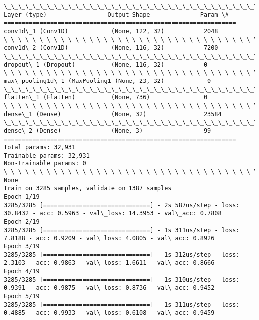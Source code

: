 \documentclass[11pt]{article}
\begin{document}
    \begin{Verbatim}[commandchars=\\\{\}]
\_\_\_\_\_\_\_\_\_\_\_\_\_\_\_\_\_\_\_\_\_\_\_\_\_\_\_\_\_\_\_\_\_\_\_\_\_\_\_\_\_\_\_\_\_\_\_\_\_\_\_\_\_\_\_\_\_\_\_\_\_\_\_\_\_
Layer (type)                 Output Shape              Param \#   
=================================================================
conv1d\_1 (Conv1D)            (None, 122, 32)           2048      
\_\_\_\_\_\_\_\_\_\_\_\_\_\_\_\_\_\_\_\_\_\_\_\_\_\_\_\_\_\_\_\_\_\_\_\_\_\_\_\_\_\_\_\_\_\_\_\_\_\_\_\_\_\_\_\_\_\_\_\_\_\_\_\_\_
conv1d\_2 (Conv1D)            (None, 116, 32)           7200      
\_\_\_\_\_\_\_\_\_\_\_\_\_\_\_\_\_\_\_\_\_\_\_\_\_\_\_\_\_\_\_\_\_\_\_\_\_\_\_\_\_\_\_\_\_\_\_\_\_\_\_\_\_\_\_\_\_\_\_\_\_\_\_\_\_
dropout\_1 (Dropout)          (None, 116, 32)           0         
\_\_\_\_\_\_\_\_\_\_\_\_\_\_\_\_\_\_\_\_\_\_\_\_\_\_\_\_\_\_\_\_\_\_\_\_\_\_\_\_\_\_\_\_\_\_\_\_\_\_\_\_\_\_\_\_\_\_\_\_\_\_\_\_\_
max\_pooling1d\_1 (MaxPooling1 (None, 23, 32)            0         
\_\_\_\_\_\_\_\_\_\_\_\_\_\_\_\_\_\_\_\_\_\_\_\_\_\_\_\_\_\_\_\_\_\_\_\_\_\_\_\_\_\_\_\_\_\_\_\_\_\_\_\_\_\_\_\_\_\_\_\_\_\_\_\_\_
flatten\_1 (Flatten)          (None, 736)               0         
\_\_\_\_\_\_\_\_\_\_\_\_\_\_\_\_\_\_\_\_\_\_\_\_\_\_\_\_\_\_\_\_\_\_\_\_\_\_\_\_\_\_\_\_\_\_\_\_\_\_\_\_\_\_\_\_\_\_\_\_\_\_\_\_\_
dense\_1 (Dense)              (None, 32)                23584     
\_\_\_\_\_\_\_\_\_\_\_\_\_\_\_\_\_\_\_\_\_\_\_\_\_\_\_\_\_\_\_\_\_\_\_\_\_\_\_\_\_\_\_\_\_\_\_\_\_\_\_\_\_\_\_\_\_\_\_\_\_\_\_\_\_
dense\_2 (Dense)              (None, 3)                 99        
=================================================================
Total params: 32,931
Trainable params: 32,931
Non-trainable params: 0
\_\_\_\_\_\_\_\_\_\_\_\_\_\_\_\_\_\_\_\_\_\_\_\_\_\_\_\_\_\_\_\_\_\_\_\_\_\_\_\_\_\_\_\_\_\_\_\_\_\_\_\_\_\_\_\_\_\_\_\_\_\_\_\_\_
None
Train on 3285 samples, validate on 1387 samples
Epoch 1/19
3285/3285 [==============================] - 2s 587us/step - loss: 30.8432 - acc: 0.5963 - val\_loss: 14.3953 - val\_acc: 0.7808
Epoch 2/19
3285/3285 [==============================] - 1s 311us/step - loss: 7.8188 - acc: 0.9209 - val\_loss: 4.0805 - val\_acc: 0.8926
Epoch 3/19
3285/3285 [==============================] - 1s 312us/step - loss: 2.3103 - acc: 0.9863 - val\_loss: 1.6611 - val\_acc: 0.8666
Epoch 4/19
3285/3285 [==============================] - 1s 310us/step - loss: 0.9391 - acc: 0.9875 - val\_loss: 0.8736 - val\_acc: 0.9452
Epoch 5/19
3285/3285 [==============================] - 1s 311us/step - loss: 0.4885 - acc: 0.9933 - val\_loss: 0.6108 - val\_acc: 0.9459

\end{Verbatim}
\end{document}
